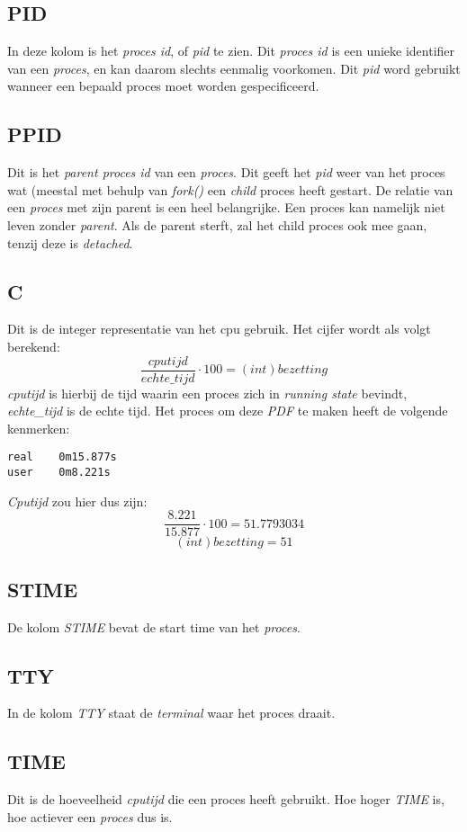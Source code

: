 \subsection{PID}
In deze kolom is het \emph{proces id}, of \emph{pid} te zien. Dit \emph{proces id} is een unieke identifier van een \emph{proces}, en kan daarom slechts eenmalig voorkomen. Dit \emph{pid} word gebruikt wanneer een bepaald proces moet worden gespecificeerd.

\subsection{PPID}
Dit is het \emph{parent proces id} van een \emph{proces}. Dit geeft het \emph{pid} weer van het proces wat (meestal met behulp van \emph{fork()} een \emph{child} proces heeft gestart. De relatie van een \emph{proces} met zijn parent is een heel belangrijke. Een proces kan namelijk niet leven zonder \emph{parent}. Als de parent sterft, zal het child proces ook mee gaan, tenzij deze is \emph{detached}. 

\subsection{C}
Dit is de integer representatie van het cpu gebruik. Het cijfer wordt als volgt berekend:
$$ \frac{cputijd}{echte\_tijd} \cdot 100 = (int) bezetting$$
\emph{cputijd} is hierbij de tijd waarin een proces zich in \emph{running state} bevindt, \emph{echte\_tijd} is de echte tijd. Het proces om deze \emph{PDF} te maken heeft de volgende kenmerken:
\begin{lstlisting}
real    0m15.877s
user    0m8.221s
\end{lstlisting}
\emph{Cputijd} zou hier dus zijn:
$$ \frac{8.221}{15.877} \cdot 100 = 51.7793034$$
$$(int) bezetting = 51$$

\subsection{STIME}
De kolom \emph{STIME} bevat de start time van het \emph{proces}. 

\subsection{TTY}
In de kolom \emph{TTY} staat de \emph{terminal} waar het proces draait. 

\subsection{TIME}
Dit is de hoeveelheid \emph{cputijd} die een proces heeft gebruikt. Hoe hoger \emph{TIME} is, hoe actiever een \emph{proces} dus is. 

